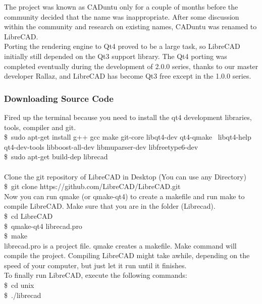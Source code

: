 The  project  was  known as CADuntu only for a  couple of months before the community decided that the
name  was  inappropriate.  After  some  discussion  within  the  community  and  research  on  existing  names, CADuntu was renamed to LibreCAD.\\

Porting  the  rendering  engine  to  Qt4  proved  to  be  a  large  task,  so  LibreCAD  initially  still  depended  on the  Qt3  support  library.  The  Qt4  porting  was  completed  eventually  during  the  development  of  2.0.0 series,  thanks  to  our  master  developer  Rallaz,  and  LibreCAD  has  become  Qt3  free except in the 1.0.0 series.\\

\subsubsection{Downloading Source Code}

Fired up the terminal because you need to install the qt4 development libraries, tools, compiler and git.\\

\$\ sudo apt-get install g++ gcc make git-core libqt4-dev qt4-qmake \
libqt4-help qt4-dev-tools libboost-all-dev libmuparser-dev libfreetype6-dev \\

\$\ sudo apt-get build-dep librecad\\ \\

\noindent Clone the git repository of LibreCAD in Desktop (You can use any Directory)\\

\$\ git clone https://github.com/LibreCAD/LibreCAD.git \\ 

\noindent Now you can run qmake (or qmake-qt4) to create a makefile and run make to compile LibreCAD. Make sure that you are in the folder (Librecad).\\

\$\ cd LibreCAD \\

\$\ qmake-qt4 librecad.pro\\

\$\ make\\

\noindent librecad.pro  is  a  project  file.  qmake  creates  a  makefile.  Make  command  will  compile  the  project. Compiling  LibreCAD  might  take  awhile,   depending  on  the  speed  of  your  computer,  but  just  let  it  run
until it finishes.\\

\noindent To finally run LibreCAD, execute the following commands:\\

\$\ cd unix\\

\$\ ./librecad

